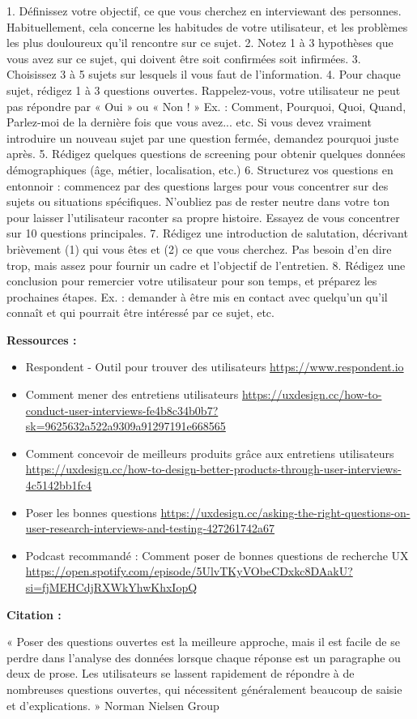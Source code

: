 1. Définissez votre objectif, ce que vous cherchez en interviewant des personnes. Habituellement, cela concerne les habitudes de votre utilisateur, et les problèmes les plus douloureux qu'il rencontre sur ce sujet.
2. Notez 1 à 3 hypothèses que vous avez sur ce sujet, qui doivent être soit confirmées soit infirmées.
3. Choisissez 3 à 5 sujets sur lesquels il vous faut de l'information.
4. Pour chaque sujet, rédigez 1 à 3 questions ouvertes. Rappelez-vous, votre utilisateur ne peut pas répondre par « Oui » ou « Non ! » Ex. : Comment, Pourquoi, Quoi, Quand, Parlez-moi de la dernière fois que vous avez... etc. Si vous devez vraiment introduire un nouveau sujet par une question fermée, demandez pourquoi juste après.
5. Rédigez quelques questions de screening pour obtenir quelques données démographiques (âge, métier, localisation, etc.)
6. Structurez vos questions en entonnoir : commencez par des questions larges pour vous concentrer sur des sujets ou situations spécifiques. N'oubliez pas de rester neutre dans votre ton pour laisser l'utilisateur raconter sa propre histoire. Essayez de vous concentrer sur 10 questions principales.
7. Rédigez une introduction de salutation, décrivant brièvement (1) qui vous êtes et (2) ce que vous cherchez. Pas besoin d'en dire trop, mais assez pour fournir un cadre et l'objectif de l'entretien.
8. Rédigez une conclusion pour remercier votre utilisateur pour son temps, et préparez les prochaines étapes. Ex. : demander à être mis en contact avec quelqu'un qu'il connaît et qui pourrait être intéressé par ce sujet, etc.

\textbf{Ressources :}

\begin{itemize}
\item Respondent - Outil pour trouver des utilisateurs \url{https://www.respondent.io}
\item Comment mener des entretiens utilisateurs \url{https://uxdesign.cc/how-to-conduct-user-interviews-fe4b8c34b0b7?sk=9625632a522a9309a91297191e668565}
\item Comment concevoir de meilleurs produits grâce aux entretiens utilisateurs \url{https://uxdesign.cc/how-to-design-better-products-through-user-interviews-4c5142bb1fc4}
\item Poser les bonnes questions \url{https://uxdesign.cc/asking-the-right-questions-on-user-research-interviews-and-testing-427261742a67}
\item Podcast recommandé : Comment poser de bonnes questions de recherche UX \url{https://open.spotify.com/episode/5UlvTKyVObeCDxkc8DAakU?si=fjMEHCdjRXWkYhwKhxIopQ}
\end{itemize}

\textbf{Citation :}

« Poser des questions ouvertes est la meilleure approche, mais il est facile de se perdre dans l'analyse des données lorsque chaque réponse est un paragraphe ou deux de prose. Les utilisateurs se lassent rapidement de répondre à de nombreuses questions ouvertes, qui nécessitent généralement beaucoup de saisie et d'explications. » Norman Nielsen Group

